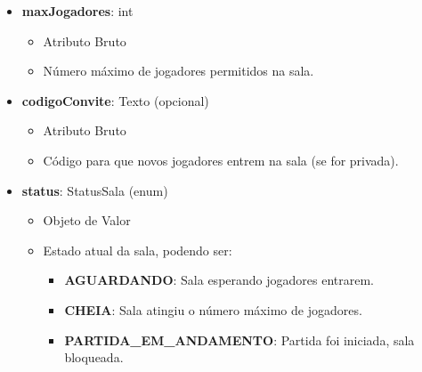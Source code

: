 \begin{itemize}
        \item \textbf{maxJogadores}: int  
              \begin{itemize}
                  \item Atributo Bruto
                  \item Número máximo de jogadores permitidos na sala.
              \end{itemize}
    
        \item \textbf{codigoConvite}: Texto (opcional)  
              \begin{itemize}
                  \item Atributo Bruto
                  \item Código para que novos jogadores entrem na sala (se for privada).
              \end{itemize}
    
        \item \textbf{status}: StatusSala (enum)  
              \begin{itemize}
                  \item Objeto de Valor
                  \item Estado atual da sala, podendo ser:
                  \begin{itemize}
                      \item \textbf{AGUARDANDO}: Sala esperando jogadores entrarem.
                      \item \textbf{CHEIA}: Sala atingiu o número máximo de jogadores.
                      \item \textbf{PARTIDA\_EM\_ANDAMENTO}: Partida foi iniciada, sala bloqueada.
                  \end{itemize}
              \end{itemize}
    \end{itemize}

